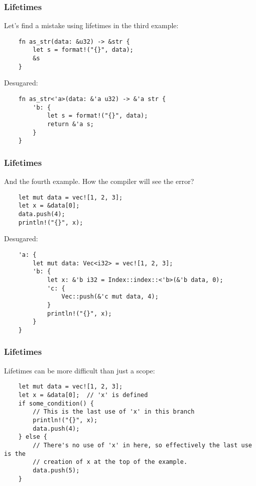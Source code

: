 \documentclass[aspectratio=1610,t]{beamer}
\begin{document}

\begin{frame}[fragile,c]
\frametitle{Lifetimes}
Let's find a mistake using lifetimes in the third example:

\begin{verbatim}
    fn as_str(data: &u32) -> &str {
        let s = format!("{}", data);
        &s
    }
\end{verbatim}

Desugared:

\begin{verbatim}
    fn as_str<'a>(data: &'a u32) -> &'a str {
        'b: {
            let s = format!("{}", data);
            return &'a s;
        }
    }
\end{verbatim}
\end{frame}


\begin{frame}[fragile,c]
\frametitle{Lifetimes}
And the fourth example. How the compiler will see the error?

\begin{verbatim}
    let mut data = vec![1, 2, 3];
    let x = &data[0];
    data.push(4);
    println!("{}", x);
\end{verbatim}

Desugared:

\begin{verbatim}
    'a: {
        let mut data: Vec<i32> = vec![1, 2, 3];
        'b: {
            let x: &'b i32 = Index::index::<'b>(&'b data, 0);
            'c: {
                Vec::push(&'c mut data, 4);
            }
            println!("{}", x);
        }
    }
\end{verbatim}
\end{frame}


\begin{frame}[fragile]
\frametitle{Lifetimes}
Lifetimes can be more difficult than just a scope:

\begin{verbatim}
    let mut data = vec![1, 2, 3];
    let x = &data[0];  // 'x' is defined
    if some_condition() {
        // This is the last use of 'x' in this branch
        println!("{}", x);
        data.push(4);
    } else {
        // There's no use of 'x' in here, so effectively the last use is the
        // creation of x at the top of the example.
        data.push(5);
    }
\end{verbatim}
\end{frame}
\end{document}
